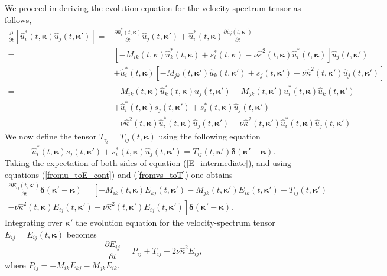 \documentclass[oneside,a4paper,11pt]{report}
\newcommand{\kappavec}{\boldsymbol{\kappa}}
\begin{document}
We proceed in deriving the evolution equation for the velocity-spectrum tensor as follows,
\begin{align}
\label{E_intermediate}
\frac{\partial}{ \partial t} [ \hat{u}_i^*(t,\kappavec) \hat{u}_j(t,\kappavec') ] =& \frac{\partial \hat{u}_i^*(t,\kappavec)}{\partial t} \hat{u}_j(t,\kappavec') + \hat{u}_i^*(t,\kappavec) \frac{\partial \hat{u}_j(t,\kappavec')}{\partial t} \nonumber \\
=& \left [ -M_{ik}(t,\kappavec) \hat{u}_k^*(t,\kappavec) + s_i^*(t,\kappavec) - \nu \hat{\kappa}^2(t,\kappavec) \hat{u}_i^*(t,\kappavec) \right ] \hat{u}_j(t,\kappavec') \nonumber \\
&+ \hat{u}_i^*(t,\kappavec)  \left [ -M_{jk}(t,\kappavec') \hat{u}_k(t,\kappavec') + s_j(t,\kappavec') - \nu \hat{\kappa}^2(t,\kappavec') \hat{u}_j(t,\kappavec') \right ] \nonumber \\
=& -M_{ik}(t,\kappavec) \hat{u}_k^*(t,\kappavec) \hat{u}_j(t,\kappavec') - M_{jk}(t,\kappavec') \hat{u}_i^*(t,\kappavec) \hat{u}_k(t,\kappavec') \nonumber \\
& + \hat{u}_i^*(t,\kappavec) s_j(t,\kappavec') + s^*_i(t,\kappavec) \hat{u}_j(t,\kappavec') \nonumber \\
& - \nu \hat{\kappa}^2(t,\kappavec) \hat{u}^*_i(t,\kappavec) \hat{u}_j(t,\kappavec') - \nu \hat{\kappa}^2(t,\kappavec') \hat{u}^*_i(t,\kappavec) \hat{u}_j(t,\kappavec')
\end{align}
We now define the tensor $T_{ij} = T_{ij}(t,\kappavec)$ using the following equation
\begin{equation}
\label{fromvs_toT}
\overline{ \hat{u}_i^*(t,\kappavec) s_j(t,\kappavec') + s^*_i(t,\kappavec) \hat{u}_j(t,\kappavec') } = T_{ij}(t,\kappavec') \boldsymbol{\delta}(\kappavec' - \kappavec).
\end{equation}
Taking the expectation of both sides of equation (\ref{E_intermediate}), and using equations (\ref{fromu_toE_cont}) and (\ref{fromvs_toT}) one obtains
\begin{equation}
\begin{split}
\frac{\partial E_{ij}(t,\kappavec')}{\partial t} \boldsymbol{\delta}(\kappavec' - \kappavec) = \left [ -M_{ik}(t,\kappavec) E_{kj}(t,\kappavec') - M_{jk}(t,\kappavec') E_{ik}(t,\kappavec') + T_{ij}(t,\kappavec') \right . \\
\left . - \nu \hat{\kappa}^2(t,\kappavec) E_{ij}(t,\kappavec') - \nu \hat{\kappa}^2(t,\kappavec') E_{ij}(t,\kappavec') \right ] \boldsymbol{\delta}(\kappavec' - \kappavec).
\end{split}
\end{equation}
Integrating over $\kappavec'$ the evolution equation for the velocity-spectrum tensor $E_{ij} = E_{ij}(t,\kappavec)$ becomes
\begin{equation}
\label{E_evol_homo}
\frac{\partial E_{ij}}{\partial t} = P_{ij} + T_{ij} - 2\nu \hat{\kappa}^2 E_{ij},
\end{equation}
where $P_{ij} = -M_{ik} E_{kj} - M_{jk} E_{ik}$.
\end{document}
